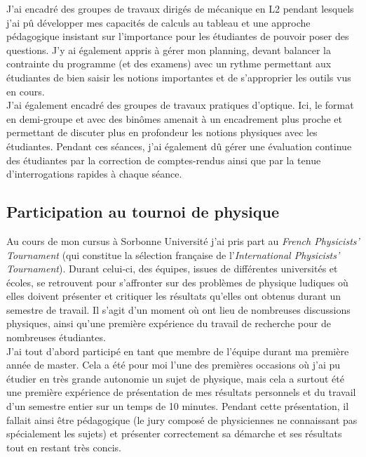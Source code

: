 \documentclass[a4paper,11pt]{article} %
\newcommand{\pointmedian}{{\fontfamily{cmr}\selectfont\textperiodcentered}}
\begin{document}
	J'ai encadré des groupes de travaux dirigés de mécanique en L2 pendant lesquels j'ai pû développer mes capacités de calculs au tableau et une approche pédagogique insistant sur l'importance pour les étudiant\pointmedian es de pouvoir poser des questions. J'y ai également appris à gérer mon planning, devant balancer la contrainte du programme (et des examens) avec un rythme permettant aux étudiant\pointmedian{}es de bien saisir les notions importantes et de s'approprier les outils vus en cours.\\
	
	J'ai également encadré des groupes de travaux pratiques d'optique. Ici, le format en demi-groupe et avec des binômes amenait à un encadrement plus proche et permettant de discuter plus en profondeur les notions physiques avec les étudiant\pointmedian es. Pendant ces séances, j'ai également dû gérer une évaluation continue des étudiant\pointmedian es par la correction de comptes-rendus ainsi que par la tenue d'interrogations rapides à chaque séance.\\
	
	\subsection{Participation au tournoi de physique}
	Au cours de mon cursus à Sorbonne Université j'ai pris part au \textit{French Physicists' Tournament} (qui constitue la sélection française de l'\textit{International Physicists' Tournament}). Durant celui-ci, des équipes, issues de différentes universités et écoles, se retrouvent pour \textgravedbl s'affronter\textacutedbl{} sur des problèmes de physique ludiques où elles doivent présenter et critiquer les résultats qu'elles ont obtenus durant un semestre de travail. Il s'agit d'un moment où ont lieu de nombreuses discussions physiques, ainsi qu'une première expérience du travail de recherche pour de nombreu\pointmedian ses étudiant\pointmedian es.\\
	
	J'ai tout d'abord participé en tant que membre de l'équipe durant ma première année de master. Cela a été pour moi l'une des premières occasions où j'ai pu étudier en très grande autonomie un sujet de physique, mais cela a surtout été une première expérience de présentation de mes résultats personnels et du travail d'un semestre entier sur un temps de 10 minutes. Pendant cette présentation, il fallait ainsi être pédagogique (le jury composé de physicien\pointmedian nes ne connaissant pas spécialement les sujets) et présenter correctement sa démarche et ses résultats tout en restant très concis.\\
	
\end{document}
